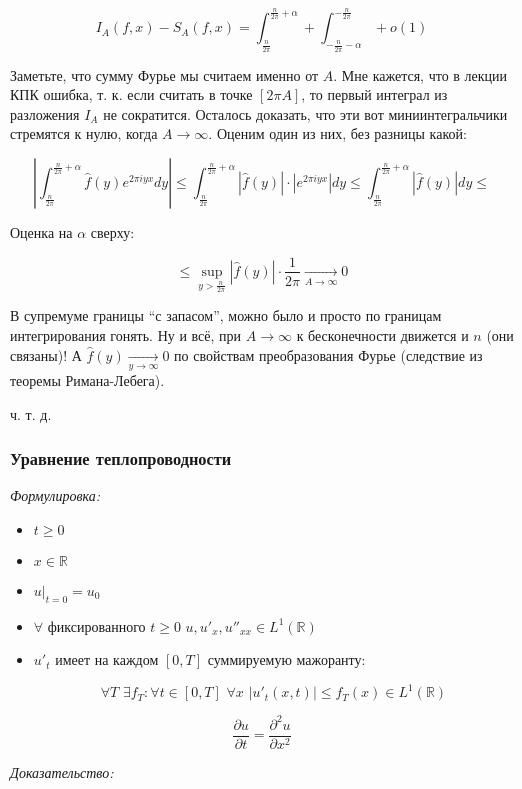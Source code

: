 \documentclass{article}
\def\dbl{\,\,}
\def\goesto#1{\underset{#1}{\longrightarrow}}
\begin{document}
\[I_A(f, x) - S_A(f, x) = \int_{\frac{n}{2\pi}}^{\frac{n}{2\pi} + \alpha} + \int_{-\frac{n}{2 \pi} - \alpha}^{-\frac{n}{2 \pi}} + o(1)\]

Заметьте, что сумму Фурье мы считаем именно от $A$. Мне кажется, что в лекции КПК ошибка, т. к. если считать в точке $[2 \pi A]$,  то первый интеграл из разложения $I_A$ не сократится. Осталось доказать, что эти вот миниинтегральчики стремятся к нулю, когда $A \rightarrow \infty$. Оценим один из них, без разницы какой:

\[\left|  \int_{\frac{n}{2\pi}}^{\frac{n}{2\pi} + \alpha} \hat{f}(y)e^{2 \pi i y x} dy\right| \le \int_{\frac{n}{2\pi}}^{\frac{n}{2\pi} + \alpha} |\hat{f}(y)| \cdot |e^{2 \pi i y x}|dy \le \int_{\frac{n}{2\pi}}^{\frac{n}{2\pi} + \alpha} |\hat{f}(y)| dy \le\]

Оценка на $\alpha$ сверху:

\[\le \sup_{y > \frac{n}{2\pi}} |\hat{f}(y)| \cdot \frac{1}{2\pi} \goesto{A \rightarrow \infty} 0\]

В супремуме границы ``с запасом'', можно было и просто по границам интегрирования гонять. Ну и всё, при $A \rightarrow \infty$ к бесконечности движется и $n$ (они связаны)! А $\hat{f}(y) \goesto{y \rightarrow \infty} 0$ по свойствам преобразования Фурье (следствие из теоремы Римана-Лебега).

ч. т. д. 

\subsubsection{Уравнение теплопроводности}
\textit{Формулировка:}

\begin{itemize}
    \item $t \ge 0$
    \item $x \in \mathbb{R}$
    \item $u|_{t = 0} = u_0$
    \item $\forall$ фиксированного $t \ge 0 \dbl u, u'_x, u''_{xx} \in L^1(\mathbb{R})$
    \item $u'_t$ имеет на каждом $[0, T]$ суммируемую мажоранту:
    
    \[\forall T \dbl \exists f_T : \forall t \in [0, T] \dbl \forall x \dbl |u'_t(x, t)| \le f_T(x) \in L^1(\mathbb{R})\]
\end{itemize}

\[\frac{\partial u}{\partial t} = \frac{\partial^2 u}{\partial x^2}\]

\textit{Доказательство:}
\end{document}
